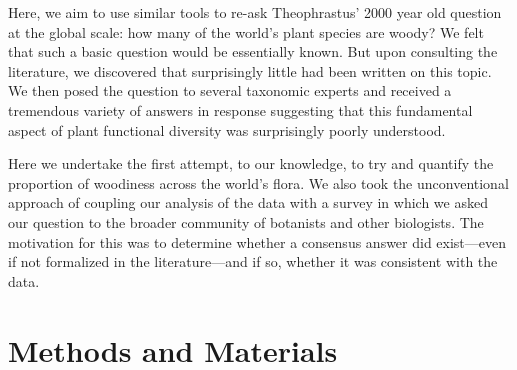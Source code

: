 \documentclass[12pt]{article}
\begin{document}
% 
Here, we aim to use similar tools to re-ask Theophrastus' 2000 year
old question at the global scale: how many of the world's plant
species are woody?
% 
We felt that such a basic question would be essentially known.  But
upon consulting the literature, we discovered that surprisingly little
had been written on this topic. We then posed the question to several
taxonomic experts and received a tremendous variety of answers in
response suggesting that this fundamental aspect of plant functional
diversity was surprisingly poorly understood. 

Here we undertake the first attempt, to our knowledge, to try and
quantify the proportion of woodiness across the world's flora. We also
took the unconventional approach of coupling our analysis of the data
with a survey in which we asked our question to the broader community
of botanists and other biologists. The motivation for this was to
determine whether a consensus answer did exist---even if not
formalized in the literature---and if so, whether it was consistent
with the data.



\section{Methods and Materials}
\end{document}
